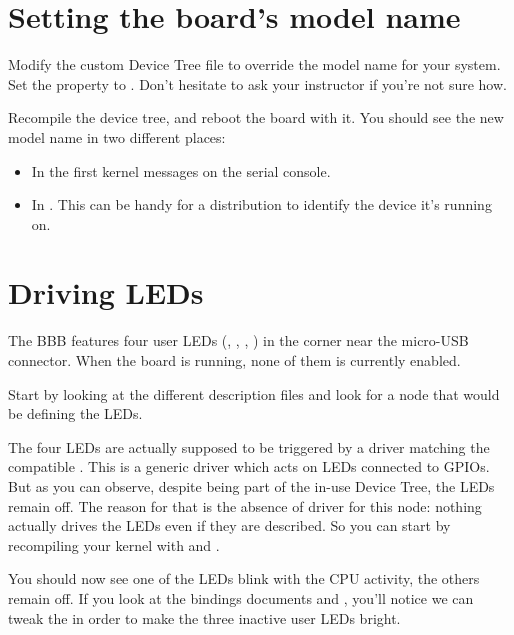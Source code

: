 \section{Setting the board's model name}

Modify the custom Device Tree file to override the model name for your
system. Set the  property to . Don't hesitate to ask your instructor if you're not sure how.

Recompile the device tree, and reboot the board with it. You should see
the new model name in two different places:

\begin{itemize}
\item In the first kernel messages on the serial console.
\item In . This can be
      handy for a distribution to identify the device it's running on.
\end{itemize}

\section{Driving LEDs}

The BBB features four user LEDs (, , ,
) in the corner near the micro-USB connector. When the board
is running, none of them is currently enabled.

Start by looking at the different description files and look for a node
that would be defining the LEDs.

The four LEDs are actually supposed to be triggered by a driver matching
the compatible . This is a generic driver which acts on
LEDs connected to GPIOs. But as you can observe, despite being part of
the in-use Device Tree, the LEDs remain off. The reason for that is the
absence of driver for this node: nothing actually drives the LEDs even
if they are described. So you can start by recompiling your kernel with
 and .

You should now see one of the LEDs blink with the CPU activity, the
others remain off. If you look at the bindings documents
 and
, you'll
notice we can tweak the  in order to make the
three inactive user LEDs bright.

